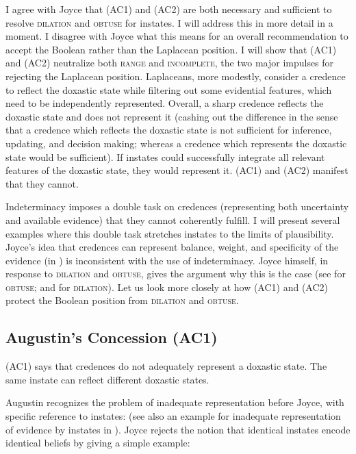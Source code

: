 \documentclass[11pt]{article}
\begin{document}
I agree with Joyce that (AC1) and (AC2) are both necessary and
sufficient to resolve \textsc{dilation} and \textsc{obtuse} for
instates. I will address this in more detail in a moment. I disagree
with Joyce what this means for an overall recommendation to accept the
Boolean rather than the Laplacean position. I will show that (AC1) and
(AC2) neutralize both \textsc{range} and \textsc{incomplete}, the two
major impulses for rejecting the Laplacean position. Laplaceans, more
modestly, consider a credence to reflect the doxastic state while
filtering out some evidential features, which need to be independently
represented. Overall, a sharp credence reflects the doxastic state and
does not represent it (cashing out the difference in the sense that a
credence which reflects the doxastic state is not sufficient for
inference, updating, and decision making; whereas a credence which
represents the doxastic state would be sufficient). If instates could
successfully integrate all relevant features of the doxastic state,
they would represent it. (AC1) and (AC2) manifest that they
cannot.

Indeterminacy imposes a double task on credences (representing both
uncertainty and available evidence) that they cannot coherently
fulfill. I will present several examples where this double task
stretches instates to the limits of plausibility. Joyce's idea that
credences can represent balance, weight, and specificity of the
evidence (in ) is inconsistent with the use of
indeterminacy. Joyce himself, in response to \textsc{dilation} and
\textsc{obtuse}, gives the argument why this is the case (see
 for \textsc{obtuse}; and
 for \textsc{dilation}). Let us look
more closely at how (AC1) and (AC2) protect the Boolean position from
\textsc{dilation} and \textsc{obtuse}.

\subsection{Augustin's Concession (AC1)}
\label{jj1}

(AC1) says that credences do not adequately represent a doxastic state.
The same instate can reflect different doxastic states.

Augustin recognizes the problem of inadequate representation before
Joyce, with specific reference to instates:   (see also an example for
inadequate representation of evidence by instates in
). Joyce rejects the notion that
identical instates encode identical beliefs by giving a simple
example:
\end{document}
